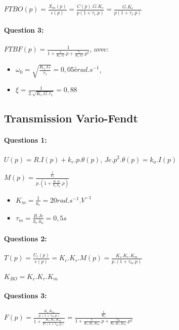 $FTBO(p)=\frac{X_m(p)}{\epsilon (p)}=\frac{C(p).G.K_c}{p(1+\tau_1.p)}=\frac{G.K_c}{p(1+\tau_1.p)}$

\paragraph{Question 3:}

$FTBF(p)=\frac{1}{1+\frac{1}{K_c.G}.p+\frac{\tau_1}{K_c.G}.p^2}$, avec:

\begin{itemize}
 \item $\omega_0=\sqrt{\frac{K_c.G}{\tau_1}}=0,05èrad.s^{-1}$,
 \item $\xi=\frac{1}{2.\sqrt{K_c.G.\tau_1}}=0,88$
\end{itemize}

\subsection{Transmission Vario-Fendt}

\paragraph{Questions 1:}

$U(p)=R.I(p)+k_e.p.\theta(p)$, $Je.p^2.\theta(p)=k_a.I(p)$

$M(p)=\frac{\frac{1}{k_e}}{p.(1+\frac{R.Je}{k_e.k_a}.p)}$

\begin{itemize}
 \item $K_m=\frac{1}{k_e}=20rad.s^{-1}.V^{-1}$
 \item $\tau_m=\frac{R.Je}{k_e.k_a}=0,5s$
\end{itemize}

\paragraph{Questions 2:}

$T(p)=\frac{U_r(p)}{\epsilon(p)}=K_c.K_r.M(p)=\frac{K_c.K_r.K_m}{p.(1+\tau_m.p)}$

$K_{BO}=K_c.K_r.K_m$

\paragraph{Questions 3:}

$F(p)=\frac{\frac{K_c.K_m}{p.(1+\tau_m.p)}}{1+\frac{K_c.K_r.K_m}{P.(1+\tau_m.p)}}=\frac{\frac{1}{K_r}}{1+\frac{1}{K_c.K_r.K_m}.p+\frac{\tau_m}{K_c.K_r.K_m}.p^2}$

